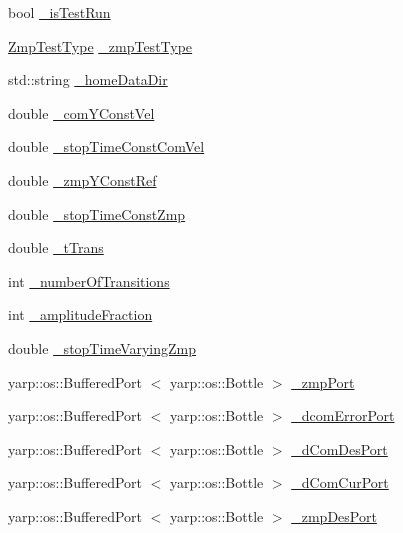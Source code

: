 \begin{DoxyCompactItemize}
\item 
bool \hyperlink{classWalkingClient_a4f9c8688537ddd8a487a212fbb279a9b}{\-\_\-is\-Test\-Run}
\item 
\hyperlink{WalkingClient_8h_afc01479a47f5a87462a54b6a9e11fffa}{\-Zmp\-Test\-Type} \hyperlink{classWalkingClient_a14576258d7fed1b36919145f1b56d74c}{\-\_\-zmp\-Test\-Type}
\item 
std\-::string \hyperlink{classWalkingClient_ade3bf018661152fc0404d3973ea30783}{\-\_\-home\-Data\-Dir}
\item 
double \hyperlink{classWalkingClient_a4e448bc147b41d97e0f17af6ebb0020f}{\-\_\-com\-Y\-Const\-Vel}
\item 
double \hyperlink{classWalkingClient_a9f19b1a1184cbdbf883cc374c6b6b88f}{\-\_\-stop\-Time\-Const\-Com\-Vel}
\item 
double \hyperlink{classWalkingClient_a6cba3194816a0be78a8b17d539806115}{\-\_\-zmp\-Y\-Const\-Ref}
\item 
double \hyperlink{classWalkingClient_a58b08317f6d8b825a21e1db8c7f0ff32}{\-\_\-stop\-Time\-Const\-Zmp}
\item 
double \hyperlink{classWalkingClient_a144518766ec4eb9eeab230fcb291e20c}{\-\_\-t\-Trans}
\item 
int \hyperlink{classWalkingClient_aefb4ed994a32879a526f2bc8c962927f}{\-\_\-number\-Of\-Transitions}
\item 
int \hyperlink{classWalkingClient_ac548ce03ea9ceffb4b42981942f66dd0}{\-\_\-amplitude\-Fraction}
\item 
double \hyperlink{classWalkingClient_a2ed3837afa0c366f1cdef16b2a99b761}{\-\_\-stop\-Time\-Varying\-Zmp}
\item 
yarp\-::os\-::\-Buffered\-Port\*
$<$ yarp\-::os\-::\-Bottle $>$ \hyperlink{classWalkingClient_af2e0817fa94ca802775addd22b09bf7a}{\-\_\-zmp\-Port}
\item 
yarp\-::os\-::\-Buffered\-Port\*
$<$ yarp\-::os\-::\-Bottle $>$ \hyperlink{classWalkingClient_a1b01264c9d9d403a68a149d86d1bc53f}{\-\_\-dcom\-Error\-Port}
\item 
yarp\-::os\-::\-Buffered\-Port\*
$<$ yarp\-::os\-::\-Bottle $>$ \hyperlink{classWalkingClient_a17369473b4fe2ff0eaecc7d41a8430c7}{\-\_\-d\-Com\-Des\-Port}
\item 
yarp\-::os\-::\-Buffered\-Port\*
$<$ yarp\-::os\-::\-Bottle $>$ \hyperlink{classWalkingClient_a1fbc9d7f1e967f24acda745028f865df}{\-\_\-d\-Com\-Cur\-Port}
\item 
yarp\-::os\-::\-Buffered\-Port\*
$<$ yarp\-::os\-::\-Bottle $>$ \hyperlink{classWalkingClient_acbac3e142471448b50dd605e4217b0d0}{\-\_\-zmp\-Des\-Port}

\end{DoxyCompactItemize}
